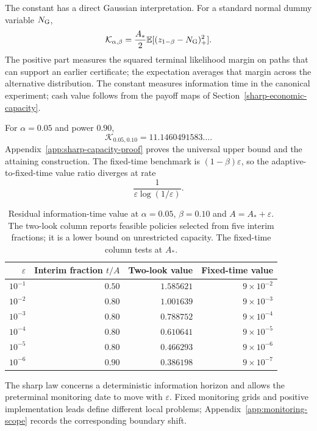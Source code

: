 \documentclass[11pt]{article}
\numberwithin{equation}{section}
\theoremstyle{plain}
\theoremstyle{definition}
\theoremstyle{remark}
\begin{document}
The constant has a direct Gaussian interpretation. For a standard normal
dummy variable $N_{\rm G}$,
\[
\mathcal K_{\alpha,\beta}
=\frac{A_*}{2}\mathbb E[(z_{1-\beta}-N_{\rm G})_+^2].
\]
The positive part measures the squared terminal likelihood margin on paths
that can support an earlier certificate; the expectation averages that
margin across the alternative distribution. The constant measures information time in the canonical experiment; cash value follows from the payoff maps of Section~\ref{sharp-economic-capacity}.

For $\alpha=0.05$ and power $0.90$,
\[
\mathcal K_{0.05,0.10}=11.1460491583\ldots.
\]
Appendix~\ref{app:sharp-capacity-proof} proves the universal upper bound and the attaining construction.  The fixed-time benchmark is $(1-\beta)\varepsilon$, so the adaptive-to-fixed-time value ratio diverges at rate
\[
\frac{1}{\varepsilon\log(1/\varepsilon)}.
\]

\begin{table}[ht]
\centering\small
\begin{tabular}{@{}rrrr@{}}\toprule
$\varepsilon$ & Interim fraction $t/A$ & Two-look value & Fixed-time value\\\midrule
$10^{-1}$ & $0.50$ & $1.585621$ & $9\times10^{-2}$\\
$10^{-2}$ & $0.80$ & $1.001639$ & $9\times10^{-3}$\\
$10^{-3}$ & $0.80$ & $0.788752$ & $9\times10^{-4}$\\
$10^{-4}$ & $0.80$ & $0.610641$ & $9\times10^{-5}$\\
$10^{-5}$ & $0.80$ & $0.466293$ & $9\times10^{-6}$\\
$10^{-6}$ & $0.90$ & $0.386198$ & $9\times10^{-7}$\\\bottomrule
\end{tabular}
\caption{Residual information-time value at $\alpha=0.05$, $\beta=0.10$ and $A=A_*+\varepsilon$.  The two-look column reports feasible policies selected from five interim fractions; it is a lower bound on unrestricted capacity.  The fixed-time column tests at $A_*$.}
\label{tab:near-critical-two-look}
\end{table}

The sharp law concerns a deterministic information horizon and allows the preterminal monitoring date to move with $\varepsilon$.  Fixed monitoring grids and positive implementation leads define different local problems; Appendix~\ref{app:monitoring-scope} records the corresponding boundary shift.
\end{document}
